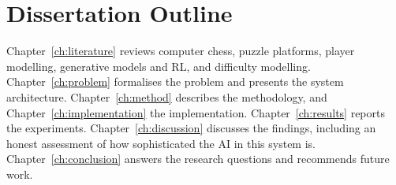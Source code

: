 \section{Dissertation Outline}

Chapter~\ref{ch:literature} reviews computer chess, puzzle platforms, player modelling, generative
models and RL, and difficulty modelling. Chapter~\ref{ch:problem} formalises the problem and presents
the system architecture. Chapter~\ref{ch:method} describes the methodology, and
Chapter~\ref{ch:implementation} the implementation. Chapter~\ref{ch:results} reports the experiments.
Chapter~\ref{ch:discussion} discusses the findings, including an honest assessment of how
sophisticated the AI in this system is. Chapter~\ref{ch:conclusion} answers the research questions
and recommends future work.
